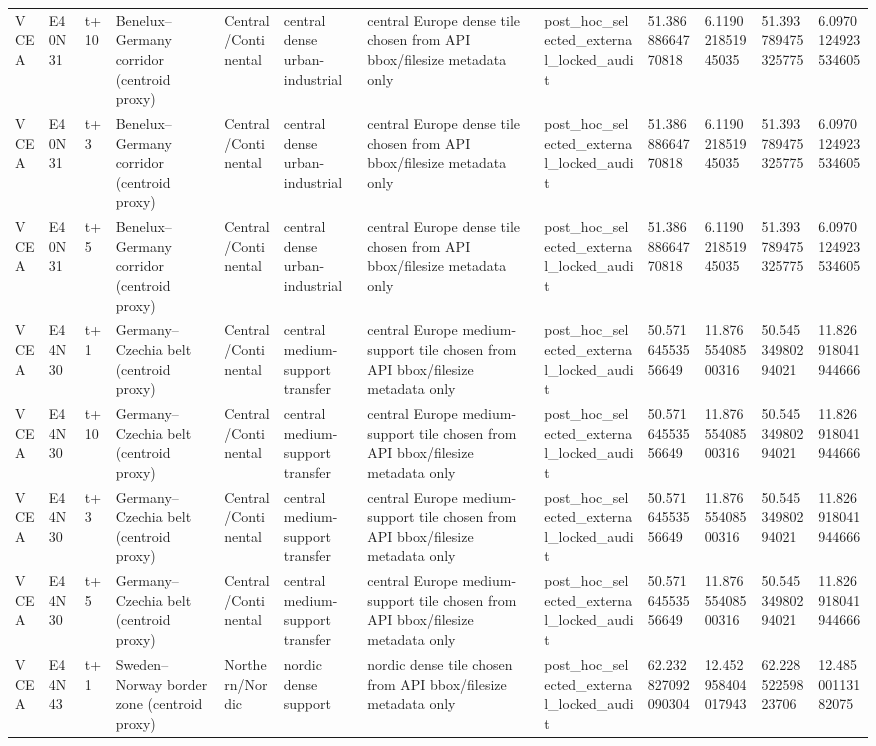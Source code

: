 \begin{landscape}
\begin{longtable}{llllllllllll}
VCEA & E40N31 & t+10 & Benelux–Germany corridor (centroid proxy) & Central/Continental & central dense urban-industrial & central Europe dense tile chosen from API bbox/filesize metadata only & post\_hoc\_selected\_external\_locked\_audit & 51.38688664770818 & 6.119021851945035 & 51.393789475325775 & 6.0970124923534605 \\
VCEA & E40N31 & t+3 & Benelux–Germany corridor (centroid proxy) & Central/Continental & central dense urban-industrial & central Europe dense tile chosen from API bbox/filesize metadata only & post\_hoc\_selected\_external\_locked\_audit & 51.38688664770818 & 6.119021851945035 & 51.393789475325775 & 6.0970124923534605 \\
VCEA & E40N31 & t+5 & Benelux–Germany corridor (centroid proxy) & Central/Continental & central dense urban-industrial & central Europe dense tile chosen from API bbox/filesize metadata only & post\_hoc\_selected\_external\_locked\_audit & 51.38688664770818 & 6.119021851945035 & 51.393789475325775 & 6.0970124923534605 \\
VCEA & E44N30 & t+1 & Germany–Czechia belt (centroid proxy) & Central/Continental & central medium-support transfer & central Europe medium-support tile chosen from API bbox/filesize metadata only & post\_hoc\_selected\_external\_locked\_audit & 50.57164553556649 & 11.87655408500316 & 50.54534980294021 & 11.826918041944666 \\
VCEA & E44N30 & t+10 & Germany–Czechia belt (centroid proxy) & Central/Continental & central medium-support transfer & central Europe medium-support tile chosen from API bbox/filesize metadata only & post\_hoc\_selected\_external\_locked\_audit & 50.57164553556649 & 11.87655408500316 & 50.54534980294021 & 11.826918041944666 \\
VCEA & E44N30 & t+3 & Germany–Czechia belt (centroid proxy) & Central/Continental & central medium-support transfer & central Europe medium-support tile chosen from API bbox/filesize metadata only & post\_hoc\_selected\_external\_locked\_audit & 50.57164553556649 & 11.87655408500316 & 50.54534980294021 & 11.826918041944666 \\
VCEA & E44N30 & t+5 & Germany–Czechia belt (centroid proxy) & Central/Continental & central medium-support transfer & central Europe medium-support tile chosen from API bbox/filesize metadata only & post\_hoc\_selected\_external\_locked\_audit & 50.57164553556649 & 11.87655408500316 & 50.54534980294021 & 11.826918041944666 \\
VCEA & E44N43 & t+1 & Sweden–Norway border zone (centroid proxy) & Northern/Nordic & nordic dense support & nordic dense tile chosen from API bbox/filesize metadata only & post\_hoc\_selected\_external\_locked\_audit & 62.232827092090304 & 12.452958404017943 & 62.22852259823706 & 12.48500113182075 \\

\end{longtable}
\end{landscape}
